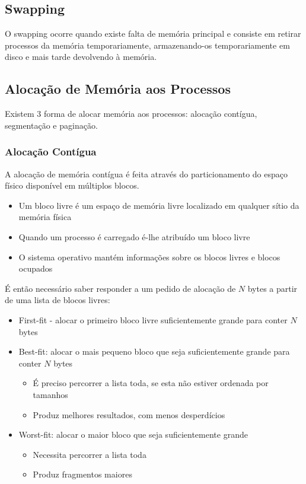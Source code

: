 \documentclass[10pt,a4paper]{report}
\begin{document}
\subsection{Swapping}
O swapping ocorre quando existe falta de memória principal e consiste em retirar processos da memória temporariamente, armazenando-os temporariamente em disco e mais tarde devolvendo à memória.
\subsection{Alocação de Memória aos Processos}
Existem 3 forma de alocar memória aos processos: alocação contígua, segmentação e paginação.
\subsubsection{Alocação Contígua}
A alocação de memória contígua é feita através do particionamento do espaço físico disponível em múltiplos blocos.
\begin{itemize}
\item Um bloco livre é um espaço de memória livre localizado em qualquer sítio da memória física
\item Quando um processo é carregado é-lhe atribuído um bloco livre
\item O sistema operativo mantém informações sobre os blocos livres e blocos ocupados
\end{itemize}
É então necessário saber responder a um pedido de alocação de $N$ bytes a partir de uma lista de blocos livres:
\begin{itemize}
\item First-fit - alocar o primeiro bloco livre suficientemente grande para conter $N$ bytes
\item Best-fit: alocar o mais pequeno bloco que seja suficientemente grande para conter $N$ bytes
\begin{itemize}
\item É preciso percorrer a lista toda, se esta não estiver ordenada por tamanhos
\item Produz melhores resultados, com menos desperdícios
\end{itemize}
\item Worst-fit: alocar o maior bloco que seja suficientemente grande
\begin{itemize}
\item Necessita percorrer a lista toda
\item Produz fragmentos maiores
\end{itemize}
\end{itemize}
\end{document}
